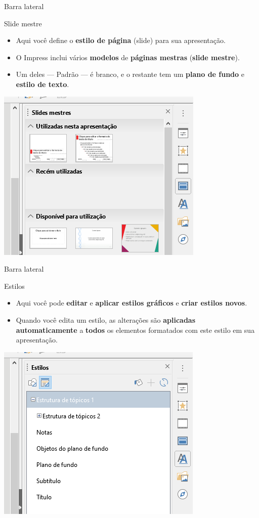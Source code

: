 \begin{frame}{Barra lateral}
	\begin{block}{Slide mestre}
		\begin{itemize}
			\item Aqui você define o \textbf{estilo de página} (slide) para sua apresentação.
			\item O Impress inclui vários \textbf{modelos} de \textbf{páginas mestras} (\textbf{slide mestre}).
			\item Um deles --- Padrão --- é branco, e o restante tem um \textbf{plano de fundo} e \textbf{estilo de texto}.
		\end{itemize}
	\end{block}

	\centering
	\includegraphics[width=0.48\linewidth]{Figuras/Ch05/fig12}
\end{frame}


\begin{frame}{Barra lateral}
	\begin{block}{Estilos}
		\begin{itemize}
			\item Aqui você pode \textbf{editar} e \textbf{aplicar estilos gráficos} e \textbf{criar estilos novos}.
			\item Quando você edita um estilo, as alterações são \textbf{aplicadas automaticamente} a \textbf{todos} os elementos formatados com este estilo em sua apresentação.
		\end{itemize}
	\end{block}

	\centering
	\includegraphics[width=0.43\linewidth]{Figuras/Ch05/fig13}
\end{frame}


